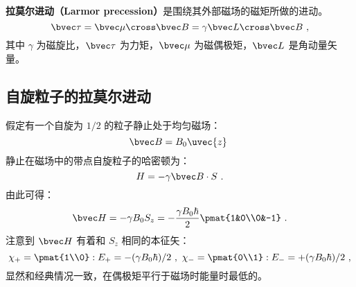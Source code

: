 
\textbf{拉莫尔进动（Larmor precession）}是围绕其外部磁场的磁矩所做的进动。
\begin{equation}
\bvec \tau = \bvec\mu\cross\bvec B=\gamma\bvec L\cross \bvec B~,
\end{equation}
其中 $\gamma$ 为磁旋比，$\bvec\tau$ 为力矩，$\bvec \mu$ 为磁偶极矩，$\bvec L$ 是角动量矢量。



\subsection{自旋粒子的拉莫尔进动}

假定有一个自旋为 $1/2$ 的粒子静止处于均匀磁场：
\begin{equation}
\bvec B =B_0\uvec{z}~
\end{equation}
静止在磁场中的带点自旋粒子的哈密顿为：
\begin{equation}
H = -\gamma\bvec B\cdot S~.
\end{equation}
由此可得：
\begin{equation}
\bvec H = -\gamma B_0S_z=-\frac{\gamma B_0\hbar}{2}\pmat{1&0\\0&-1}~.
\end{equation}
注意到 $\bvec H$ 有着和 $S_z$ 相同的本征矢：
\begin{equation}
\chi_+ = \pmat{1\\0}:E_+=-(\gamma B_0\hbar)/2~,\ \chi_- = \pmat{0\\1}:E_-=+(\gamma B_0\hbar)/2~,
\end{equation}
显然和经典情况一致，在偶极矩平行于磁场时能量时最低的。

